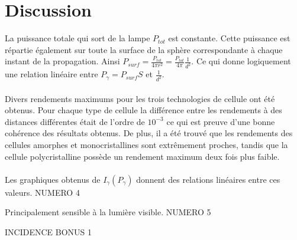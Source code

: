 \section{Discussion}

La puissance totale qui sort de la lampe \(P_{tot}\) est constante. Cette puissance est répartie également sur toute la surface de la sphère correspondante à chaque instant de la propagation. Ainsi \(P_{surf} = \frac{P_{tot}}{4 \pi r^2} = \frac{P_{tot}}{4 \pi} \frac{1}{d^2} \). Ce qui donne logiquement une relation linéaire entre \(P_\gamma = P_{surf} S\) et \(\frac{1}{d^2}\).

\paragraph{}
Divers rendements maximums pour les trois technologies de cellule ont été obtenus. Pour chaque type de cellule la différence entre les rendements à des distances différentes était de l'ordre de \(10^{-3}\) ce qui est preuve d'une bonne cohérence des résultats obtenus. De plus, il a été trouvé que les rendements des cellules amorphes et monocristallines sont extrêmement proches, tandis que la cellule polycristalline possède un rendement maximum deux fois plus faible.

\paragraph{}
Les graphiques obtenus de \(I_\gamma (P_\gamma)\) donnent des relations linéaires entre ces valeurs. NUMERO 4




Principalement sensible à la lumière visible. NUMERO 5


INCIDENCE  BONUS 1


